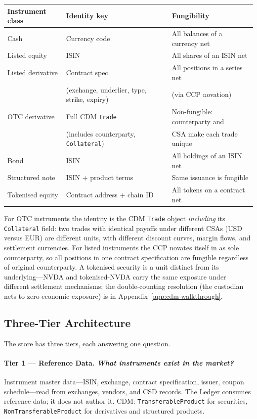 \begin{center}
\small
\begin{tabular}{lll}
\toprule
\textbf{Instrument class} & \textbf{Identity key} & \textbf{Fungibility} \\
\midrule
Cash & Currency code & All balances of a currency net \\
Listed equity & ISIN & All shares of an ISIN net \\
Listed derivative & Contract spec & All positions in a series net \\
 & (exchange, underlier, type, strike, expiry) & (via CCP novation) \\
OTC derivative & Full CDM \texttt{Trade} & Non-fungible: counterparty and \\
 & (includes counterparty, \texttt{Collateral}) & CSA make each trade unique \\
Bond & ISIN & All holdings of an ISIN net \\
Structured note & ISIN + product terms & Same issuance is fungible \\
Tokenised equity & Contract address + chain ID & All tokens on a contract net \\
\bottomrule
\end{tabular}
\end{center}

For OTC instruments the identity is the CDM \texttt{Trade} object \emph{including} its \texttt{Collateral} field: two trades with identical payoffs under different CSAs (USD versus EUR) are different units, with different discount curves, margin flows, and settlement currencies. For listed instruments the CCP novates itself in as sole counterparty, so all positions in one contract specification are fungible regardless of original counterparty. A tokenised security is a unit distinct from its underlying---NVDA and tokenised-NVDA carry the same exposure under different settlement mechanisms; the double-counting resolution (the custodian nets to zero economic exposure) is in Appendix~\ref{app:cdm-walkthrough}.

\subsection{Three-Tier Architecture}

The store has three tiers, each answering one question.

\paragraph{Tier 1 --- Reference Data. \emph{What instruments exist in the market?}}
Instrument master data---ISIN, exchange, contract specification, issuer, coupon schedule---read from exchanges, vendors, and CSD records. The Ledger consumes reference data; it does not author it. CDM: \texttt{TransferableProduct} for securities, \texttt{NonTransferableProduct} for derivatives and structured products.

